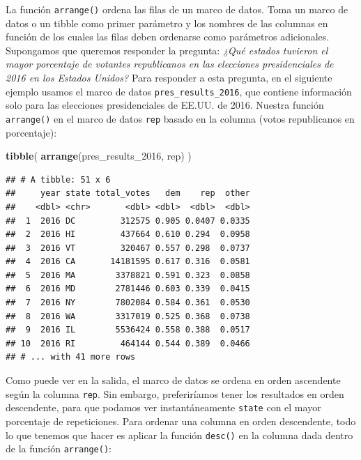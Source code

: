 \documentclass[
]{book}
\newenvironment{Shaded}{\begin{snugshade}}{\end{snugshade}}
\newcommand{\DecValTok}[1]{\textcolor[rgb]{0.00,0.00,0.81}{#1}}
\newcommand{\KeywordTok}[1]{\textcolor[rgb]{0.13,0.29,0.53}{\textbf{#1}}}
\newcommand{\NormalTok}[1]{#1}
\newcommand{\OperatorTok}[1]{\textcolor[rgb]{0.81,0.36,0.00}{\textbf{#1}}}
\newcommand{\StringTok}[1]{\textcolor[rgb]{0.31,0.60,0.02}{#1}}
\begin{document}
La función \texttt{arrange()} ordena las filas de un marco de datos. Toma un marco de datos o un tibble como primer parámetro y los nombres de las columnas en función de los cuales las filas deben ordenarse como parámetros adicionales. Supongamos que queremos responder la pregunta: \emph{¿Qué estados tuvieron el mayor porcentaje de votantes republicanos en las elecciones presidenciales de 2016 en los Estados Unidos?} Para responder a esta pregunta, en el siguiente ejemplo usamos el marco de datos \texttt{pres\_results\_2016}, que contiene información solo para las elecciones presidenciales de EE.UU. de 2016. Nuestra función \texttt{arrange()} en el marco de datos \texttt{rep} basado en la columna (votos republicanos en porcentaje):

\begin{Shaded}
\end{Shaded}

\begin{Shaded}
\begin{Highlighting}[]
\KeywordTok{tibble}\NormalTok{(}
\KeywordTok{arrange}\NormalTok{(pres_results_}\DecValTok{2016}\NormalTok{, rep)}
\NormalTok{)}
\end{Highlighting}
\end{Shaded}

\begin{verbatim}
## # A tibble: 51 x 6
##     year state total_votes   dem    rep  other
##    <dbl> <chr>       <dbl> <dbl>  <dbl>  <dbl>
##  1  2016 DC         312575 0.905 0.0407 0.0335
##  2  2016 HI         437664 0.610 0.294  0.0958
##  3  2016 VT         320467 0.557 0.298  0.0737
##  4  2016 CA       14181595 0.617 0.316  0.0581
##  5  2016 MA        3378821 0.591 0.323  0.0858
##  6  2016 MD        2781446 0.603 0.339  0.0415
##  7  2016 NY        7802084 0.584 0.361  0.0530
##  8  2016 WA        3317019 0.525 0.368  0.0738
##  9  2016 IL        5536424 0.558 0.388  0.0517
## 10  2016 RI         464144 0.544 0.389  0.0466
## # ... with 41 more rows
\end{verbatim}

Como puede ver en la salida, el marco de datos se ordena en orden ascendente según la columna \texttt{rep}. Sin embargo, preferiríamos tener los resultados en orden descendente, para que podamos ver instantáneamente \texttt{state} con el mayor porcentaje de repeticiones. Para ordenar una columna en orden descendente, todo lo que tenemos que hacer es aplicar la función \texttt{desc()} en la columna dada dentro de la función \texttt{arrange()}:
\end{document}
